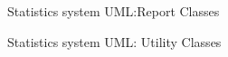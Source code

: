 ﻿\documentclass{article}
\begin{document}
\begin{figure}[H]
    \centering
    \begin{center}
    \end{center}
    \caption{Statistics system UML:Report Classes}
    \label{fig:my_label}
\end{figure}
\begin{figure}[H]
    \centering
    \begin{center}
    \end{center}
    \caption{Statistics system UML: Utility Classes}
    \label{fig:my_label}
\end{figure}
\pagebreak
\end{document}
